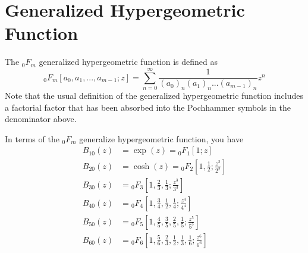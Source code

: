 \section{Generalized Hypergeometric Function}
The ${}_{0}F_{m}$ generalized hypergeometric function is defined as
\begin{equation}
    {}_{0}F_{m}\left[a_{0}, a_{1}, ..., a_{m-1}; z\right] = \sum_{n=0}^{\infty} \frac{1}{(a_{0})_{n}(a_{1})_{n}...(a_{m-1})_{n}} z^{n}
\end{equation}
Note that the usual definition of the generalized hypergeometric function includes a factorial factor that has been absorbed into the Pochhammer symbols in the denominator above.

In terms of the ${}_{0}F_{m}$ generalize hypergeometric function, you have
\begin{align}
    B_{10}(z) &= \exp(z) = {}_{0}F_{1}\left[1; z\right] \\
    B_{20}(z) &= \cosh(z) = {}_{0}F_{2}\left[1, \frac{1}{2}; \frac{z^{2}}{2^{2}} \right] \\
    B_{30}(z) &= {}_{0}F_{3}\left[1, \frac{2}{3}, \frac{1}{3}; \frac{z^{3}}{3^{3}} \right] \\
    B_{40}(z) &= {}_{0}F_{4}\left[1, \frac{3}{4}, \frac{1}{2}, \frac{1}{4}; \frac{z^{4}}{4^{4}}\right] \\
    B_{50}(z) &= {}_{0}F_{5}\left[1, \frac{4}{5}, \frac{3}{5}, \frac{2}{5}, \frac{1}{5}; \frac{z^{5}}{5^{5}}\right] \\
    B_{60}(z) &= {}_{0}F_{6}\left[1, \frac{5}{6}, \frac{2}{3}, \frac{1}{2}, \frac{1}{3}, \frac{1}{6}; \frac{z^{6}}{6^{6}}\right]
\end{align}